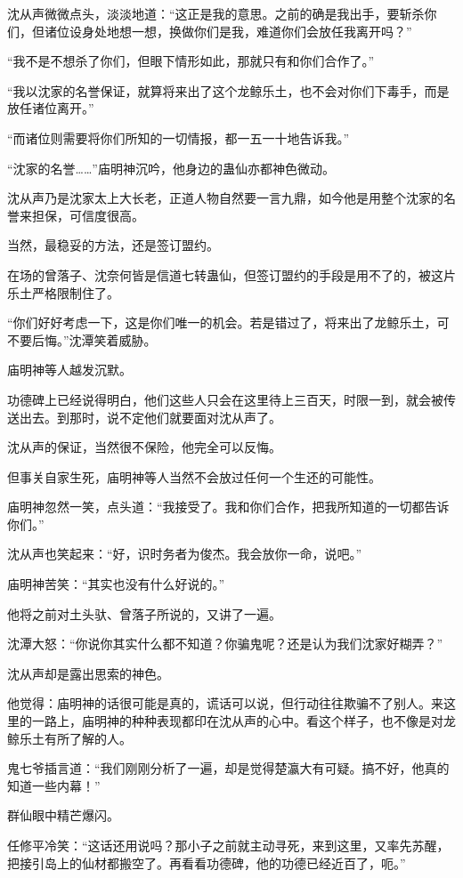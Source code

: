\begin{this_body}
沈从声微微点头，淡淡地道：“这正是我的意思。之前的确是我出手，要斩杀你们，但诸位设身处地想一想，换做你们是我，难道你们会放任我离开吗？”

“我不是不想杀了你们，但眼下情形如此，那就只有和你们合作了。”

“我以沈家的名誉保证，就算将来出了这个龙鲸乐土，也不会对你们下毒手，而是放任诸位离开。”

“而诸位则需要将你们所知的一切情报，都一五一十地告诉我。”

“沈家的名誉……”庙明神沉吟，他身边的蛊仙亦都神色微动。

沈从声乃是沈家太上大长老，正道人物自然要一言九鼎，如今他是用整个沈家的名誉来担保，可信度很高。

当然，最稳妥的方法，还是签订盟约。

在场的曾落子、沈奈何皆是信道七转蛊仙，但签订盟约的手段是用不了的，被这片乐土严格限制住了。

“你们好好考虑一下，这是你们唯一的机会。若是错过了，将来出了龙鲸乐土，可不要后悔。”沈潭笑着威胁。

庙明神等人越发沉默。

功德碑上已经说得明白，他们这些人只会在这里待上三百天，时限一到，就会被传送出去。到那时，说不定他们就要面对沈从声了。

沈从声的保证，当然很不保险，他完全可以反悔。

但事关自家生死，庙明神等人当然不会放过任何一个生还的可能性。

庙明神忽然一笑，点头道：“我接受了。我和你们合作，把我所知道的一切都告诉你们。”

沈从声也笑起来：“好，识时务者为俊杰。我会放你一命，说吧。”

庙明神苦笑：“其实也没有什么好说的。”

他将之前对土头驮、曾落子所说的，又讲了一遍。

沈潭大怒：“你说你其实什么都不知道？你骗鬼呢？还是认为我们沈家好糊弄？”

沈从声却是露出思索的神色。

他觉得：庙明神的话很可能是真的，谎话可以说，但行动往往欺骗不了别人。来这里的一路上，庙明神的种种表现都印在沈从声的心中。看这个样子，也不像是对龙鲸乐土有所了解的人。

鬼七爷插言道：“我们刚刚分析了一遍，却是觉得楚瀛大有可疑。搞不好，他真的知道一些内幕！”

群仙眼中精芒爆闪。

任修平冷笑：“这话还用说吗？那小子之前就主动寻死，来到这里，又率先苏醒，把接引岛上的仙材都搬空了。再看看功德碑，他的功德已经近百了，呃。”


\end{this_body}

